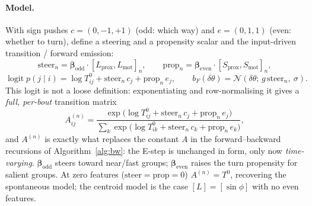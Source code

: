 \documentclass[11pt]{article}
\begin{document}
\paragraph{Model.}
With sign pushes $c=(0,-1,+1)$ (odd: which way) and $e=(0,1,1)$ (even: whether to
turn), define a steering and a propensity scalar and the input-driven transition /
forward emission:
\[
\text{steer}_n=\boldsymbol\beta_{\text{odd}}\!\cdot\![L_{\text{prox}},L_{\text{mot}}]_n,
\qquad
\text{prop}_n=\boldsymbol\beta_{\text{even}}\!\cdot\![S_{\text{prox}},S_{\text{mot}}]_n,
\]
\[
\operatorname{logit}p(j\mid i)=\log T^0_{ij}+\text{steer}_n\,c_j+\text{prop}_n\,e_j,
\qquad
b_F(\delta\theta)=\mathcal N(\delta\theta;\,g\,\text{steer}_n,\ \sigma).
\]
This logit is not a loose definition: exponentiating and row-normalising it gives
a \emph{full, per-bout} transition matrix
\begin{equation}
A^{(n)}_{ij}=\frac{\exp\!\big(\log T^0_{ij}+\text{steer}_n\,c_j+\text{prop}_n\,e_j\big)}
                  {\sum_{k}\exp\!\big(\log T^0_{ik}+\text{steer}_n\,c_k+\text{prop}_n\,e_k\big)},
\label{eq:An}
\end{equation}
and $A^{(n)}$ is exactly what replaces the constant $A$ in the forward--backward
recursions of Algorithm~\ref{alg:bw}: the E-step is unchanged in form, only now
\emph{time-varying}. $\boldsymbol\beta_{\text{odd}}$ steers toward near/fast
groups; $\boldsymbol\beta_{\text{even}}$ raises the turn propensity for salient
groups. At zero features ($\text{steer}=\text{prop}=0$) $A^{(n)}=T^0$, recovering
the spontaneous model; the centroid model is the case $[L]=[\sin\phi]$ with no
even features.
\end{document}
